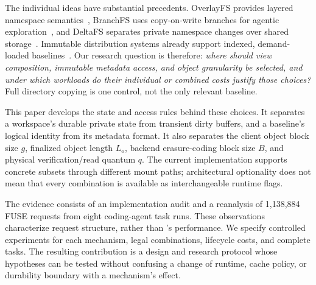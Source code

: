 The individual ideas have substantial precedents. OverlayFS provides layered
namespace semantics~\cite{overlayfs}, BranchFS uses copy-on-write branches for
agentic exploration~\cite{branchfs2026}, and DeltaFS separates private namespace
changes over shared storage~\cite{deltafs2021}. Immutable distribution systems
already support indexed, demand-loaded baselines~\cite{cvmfs2011,nydus_rafs}.
Our research question is therefore: \emph{where should view composition,
immutable metadata access, and object granularity be selected, and under
which workloads do their individual or combined costs justify those choices?}
Full directory copying is one control, not the only relevant baseline.

This paper develops the state and access rules behind these choices. It
separates a workspace's durable private state from transient dirty buffers,
and a baseline's logical identity from its metadata format. It also separates
the client object block size $g$, finalized object length $L_o$, backend
erasure-coding block size $B$, and physical verification/read quantum $q$.
The current implementation supports concrete subsets through different mount
paths; architectural optionality does not mean that every combination is
available as interchangeable runtime flags.

The evidence consists of an implementation audit and a reanalysis of
1,138,884 FUSE requests from eight coding-agent task runs. These observations
characterize request structure, rather than \sysname's performance. We specify
controlled experiments for each mechanism, legal combinations, lifecycle
costs, and complete tasks. The resulting contribution is a design and research
protocol whose hypotheses can be tested without confusing a change of runtime,
cache policy, or durability boundary with a mechanism's effect.
